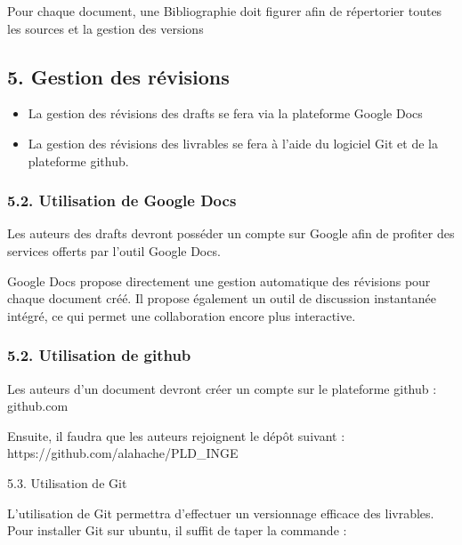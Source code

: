 \documentclass{article}
\begin{document}
\bigskip

Pour chaque document, une Bibliographie doit figurer afin de répertorier
toutes les sources et la gestion des versions

\subsection[5. Gestion des révisions]{5. Gestion des révisions}

\bigskip

\begin{itemize}
\item La gestion des révisions des drafts se fera via la plateforme
Google Docs
\end{itemize}
\begin{itemize}
\item La gestion des révisions des livrables se fera à l’aide du
logiciel Git et de la plateforme github.
\end{itemize}

\bigskip

\subsubsection[5.2. Utilisation de Google Docs]{5.2. Utilisation de
Google Docs}
Les auteurs des drafts devront posséder un compte sur Google afin de
profiter des services offerts par l’outil Google Docs.


\bigskip

Google Docs propose directement une gestion automatique des révisions
pour chaque document créé. Il propose également un outil de discussion
instantanée intégré, ce qui permet une collaboration encore plus
interactive.

\subsubsection[5.2. Utilisation de github]{5.2. Utilisation de github}
Les auteurs d’un document devront créer un compte sur le plateforme
github : github.com 


\bigskip

Ensuite, il faudra que les auteurs rejoignent le dépôt suivant :
https://github.com/alahache/PLD\_INGE


\bigskip

5.3. Utilisation de Git


\bigskip

L’utilisation de Git permettra d’effectuer un versionnage efficace des
livrables. Pour installer Git sur ubuntu, il suffit de taper la
commande :
\end{document}
